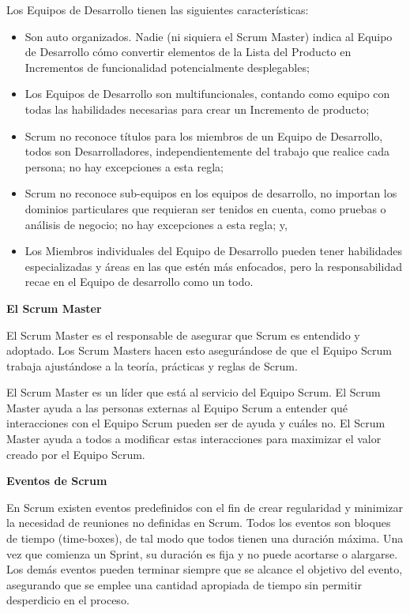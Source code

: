 \documentclass[12pt]{report}%
\begin{document}
Los Equipos de Desarrollo tienen las siguientes características: 
\begin{itemize}
\item Son auto organizados. Nadie (ni siquiera el Scrum Master) indica al Equipo de Desarrollo cómo convertir elementos de la Lista del Producto en Incrementos de funcionalidad potencialmente desplegables; 
\item Los Equipos de Desarrollo son multifuncionales, contando como equipo con todas las habilidades necesarias para crear un Incremento de producto; 
\item Scrum no reconoce títulos para los miembros de un Equipo de Desarrollo, todos son Desarrolladores, independientemente del trabajo que realice cada persona; no hay excepciones a esta regla; 
\item Scrum no reconoce sub-equipos en los equipos de desarrollo, no importan los dominios particulares que requieran ser tenidos en cuenta, como pruebas o análisis de negocio; no hay excepciones a esta regla; y, 
\item Los Miembros individuales del Equipo de Desarrollo pueden tener habilidades especializadas y áreas en las que estén más enfocados, pero la responsabilidad recae en el Equipo de desarrollo como un todo. 
\end{itemize}

\textbf {El Scrum Master }

El Scrum Master es el responsable de asegurar que Scrum es entendido y adoptado. Los Scrum Masters hacen esto asegurándose de que el Equipo Scrum trabaja ajustándose a la teoría, prácticas y reglas de Scrum. 

El Scrum Master es un líder que está al servicio del Equipo Scrum. El Scrum Master ayuda a las personas externas al Equipo Scrum a entender qué interacciones con el Equipo Scrum pueden ser de ayuda y cuáles no. El Scrum Master ayuda a todos a modificar estas interacciones para maximizar el valor creado por el Equipo Scrum.

\textbf {Eventos de Scrum} 

En Scrum existen eventos predefinidos con el fin de crear regularidad y minimizar la necesidad de reuniones no definidas en Scrum. Todos los eventos son bloques de tiempo (time-boxes), de tal modo que todos tienen una duración máxima. Una vez que comienza un Sprint, su duración es fija y no puede acortarse o alargarse.
 Los demás eventos pueden terminar siempre que se alcance el objetivo del evento, asegurando que se emplee una cantidad apropiada de tiempo sin permitir desperdicio en el proceso.
 
\end{document}
